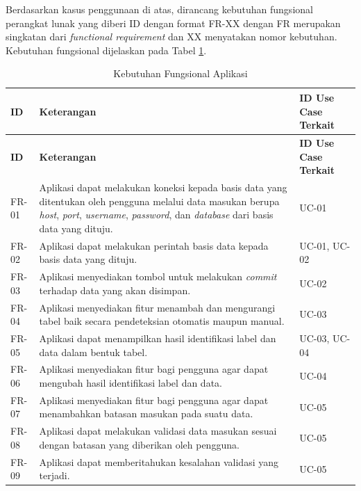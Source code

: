 	Berdasarkan kasus penggunaan di atas, dirancang kebutuhan fungsional perangkat lunak yang diberi ID dengan format FR-XX dengan FR merupakan singkatan dari \textit{functional requirement} dan XX menyatakan nomor kebutuhan. Kebutuhan fungsional dijelaskan pada Tabel \ref{KebutuhanFungsional}.

	\begin{small}
	\begin{longtable}{ | p{2cm} | p{6cm} | p{4cm} | }
	    \caption{Kebutuhan Fungsional Aplikasi}
	    \label{KebutuhanFungsional}\\ \hline
	    \centering\bfseries{ID} & \centering\bfseries{Keterangan} & \centering\bfseries{ID Use Case Terkait} \tabularnewline \hline
	    \endfirsthead
	    \hline
	    \centering\bfseries{ID} & \centering\bfseries{Keterangan} & \centering\bfseries{ID Use Case Terkait} \tabularnewline \hline
	    \endhead
	    FR-01 & Aplikasi dapat melakukan koneksi kepada basis data yang ditentukan oleh pengguna melalui data masukan berupa \textit{host}, \textit{port}, \textit{username}, \textit{password}, dan \textit{database} dari basis data yang dituju. & UC-01 \\ \hline
	    FR-02 & Aplikasi dapat melakukan perintah basis data kepada basis data yang dituju. & UC-01, UC-02 \\ \hline
	    FR-03 & Aplikasi menyediakan tombol untuk melakukan \textit{commit} terhadap data yang akan disimpan. & UC-02 \\ \hline
	    FR-04 & Aplikasi menyediakan fitur menambah dan mengurangi tabel baik secara pendeteksian otomatis maupun manual. & UC-03 \\ \hline
	    FR-05 & Aplikasi dapat menampilkan hasil identifikasi label dan data dalam bentuk tabel. & UC-03, UC-04 \\ \hline
	    FR-06 & Aplikasi menyediakan fitur bagi pengguna agar dapat mengubah hasil identifikasi label dan data. & UC-04 \\ \hline
	    FR-07 & Aplikasi menyediakan fitur bagi pengguna agar dapat menambahkan batasan masukan pada suatu data. & UC-05 \\ \hline
	    FR-08 & Aplikasi dapat melakukan validasi data masukan sesuai dengan batasan yang diberikan oleh pengguna. & UC-05 \\ \hline
	    FR-09 & Aplikasi dapat memberitahukan kesalahan validasi yang terjadi. & UC-05 \\ \hline
	\end{longtable}
	\end{small}

